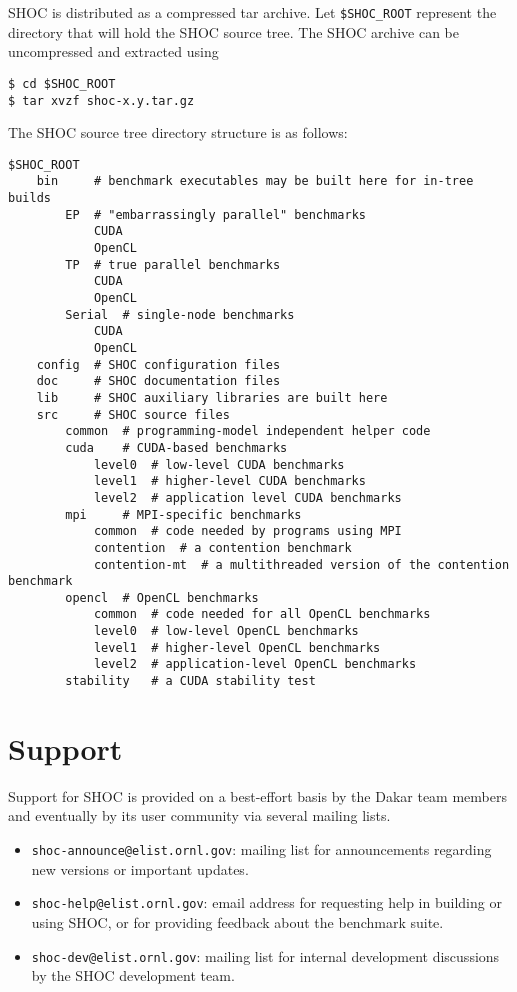 \documentclass[11pt]{article}
\begin{document}
SHOC is distributed as a compressed tar archive.
Let \verb+$SHOC_ROOT+ represent the directory that will hold the SHOC source
tree.
The SHOC archive can be uncompressed and extracted using 
\begin{Verbatim}[frame=single]
$ cd $SHOC_ROOT
$ tar xvzf shoc-x.y.tar.gz
\end{Verbatim}

\pagebreak

The SHOC source tree directory structure is as follows:

\begin{Verbatim}[frame=single]
$SHOC_ROOT
    bin     # benchmark executables may be built here for in-tree builds
        EP  # "embarrassingly parallel" benchmarks
            CUDA
            OpenCL
        TP  # true parallel benchmarks
            CUDA
            OpenCL
        Serial  # single-node benchmarks
            CUDA
            OpenCL
    config  # SHOC configuration files
    doc     # SHOC documentation files
    lib     # SHOC auxiliary libraries are built here
    src     # SHOC source files
        common  # programming-model independent helper code
        cuda    # CUDA-based benchmarks
            level0  # low-level CUDA benchmarks
            level1  # higher-level CUDA benchmarks
            level2  # application level CUDA benchmarks
        mpi     # MPI-specific benchmarks
            common  # code needed by programs using MPI
            contention  # a contention benchmark
            contention-mt  # a multithreaded version of the contention benchmark
        opencl  # OpenCL benchmarks
            common  # code needed for all OpenCL benchmarks
            level0  # low-level OpenCL benchmarks
            level1  # higher-level OpenCL benchmarks
            level2  # application-level OpenCL benchmarks
        stability   # a CUDA stability test
\end{Verbatim}

\section{Support}\label{sec:support}

Support for SHOC is provided on a best-effort basis by the Dakar team members
and eventually by its user community via several mailing lists.
\begin{itemize}
\item \verb+shoc-announce@elist.ornl.gov+: mailing list for announcements
regarding new versions or important updates.
\item \verb+shoc-help@elist.ornl.gov+: email address for requesting
help in building or using SHOC, or for providing feedback about the benchmark 
suite.
\item \verb+shoc-dev@elist.ornl.gov+: mailing list for internal 
development discussions by the SHOC development team.
\end{itemize}
\end{document}

